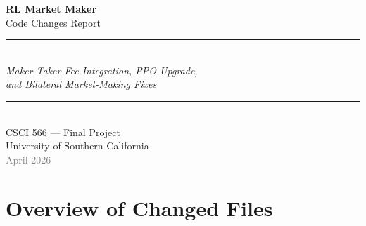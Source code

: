 \documentclass[11pt,a4paper]{article}
\begin{document}
\begin{titlepage}
    \centering
    \vspace*{2cm}
    {\Huge\bfseries\color{accentblue} RL Market Maker\\[0.4em]}
    {\LARGE Code Changes Report\\[1em]}
    \rule{\linewidth}{1pt}\\[1em]
    {\large\textit{Maker-Taker Fee Integration, PPO Upgrade,\\
    and Bilateral Market-Making Fixes}}\\[2em]
    \rule{\linewidth}{0.5pt}\\[2em]
    {\large CSCI 566 — Final Project\\[0.5em]}
    {\normalsize University of Southern California\\[2em]}
    {\normalsize\textcolor{gray}{April 2026}}
    \vfill
    \begin{abstract}
        \noindent
        This report documents six categories of code changes applied to the
        \texttt{rl\_marketmaker} repository.  The primary goal is to introduce
        a realistic \textbf{maker-taker fee structure} that incentivises
        the reinforcement-learning agent to prefer passive limit orders over
        aggressive market orders, and to upgrade the PPO training loop to
        production-grade standards.  Supporting changes fix bilateral
        market-making order-tracking bugs, remove Colab-specific boilerplate,
        and relax assertions that were incompatible with short-selling.
    \end{abstract}
\end{titlepage}

\tableofcontents
\newpage

\section{Overview of Changed Files}
\end{document}

